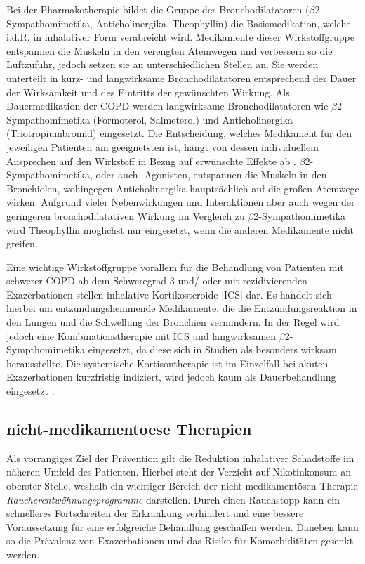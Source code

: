 Bei der Pharmakotherapie bildet die Gruppe der Bronchodilatatoren ($\beta$2- Sympathomimetika, Anticholinergika, Theophyllin) die Basismedikation, welche i.d.R. in inhalativer Form verabreicht wird.
Medikamente dieser Wirkstoffgruppe entspannen die Muskeln in den verengten Atemwegen und verbessern so die Luftzufuhr, jedoch setzen sie an unterschiedlichen Stellen an.
Sie werden unterteilt in kurz- und langwirksame Bronchodilatatoren entsprechend der Dauer der Wirksamkeit und des Eintritts der gewünschten Wirkung. Als Dauermedikation der COPD werden langwirksame Bronchodilatatoren wie $\beta$2-Sympathomimetika (Formoterol, Salmeterol) und Anticholinergika (Triotropiumbromid) eingesetzt. Die Entscheidung, welches Medikament für den jeweiligen Patienten am geeignetsten ist, hängt von dessen individuellem Ansprechen auf den Wirkstoff in Bezug auf erwünschte Effekte ab \autocite[vgl.][e13]{vogelmeier2007}. $\beta$2-Sympathomimetika, oder auch -Agonisten, entspannen die Muskeln in den Bronchiolen, wohingegen Anticholinergika hauptsächlich auf die großen Atemwege wirken. Aufgrund vieler Nebenwirkungen und Interaktionen aber auch wegen der geringeren bronchodilatativen Wirkung im Vergleich zu $\beta$2-Sympathomimetika wird Theophyllin möglichst nur eingesetzt, wenn die anderen Medikamente nicht greifen. 

Eine wichtige Wirkstoffgruppe vorallem für die Behandlung von Patienten mit schwerer COPD ab dem Schweregrad 3 und/ oder mit rezidivierenden Exazerbationen stellen inhalative Kortikosteroide [ICS] dar. Es handelt sich hierbei um entzündungshemmende Medikamente, die die Entzündungsreaktion in den Lungen und die Schwellung der Bronchien vermindern. In der Regel wird jedoch eine Kombinationstherapie mit ICS und langwirksamen $\beta$2-Sympthomimetika eingesetzt, da diese sich in Studien als besonders wirksam herausstellte. Die systemische Kortisontherapie ist im Einzelfall bei akuten Exazerbationen kurzfristig indiziert, wird jedoch kaum als Dauerbehandlung eingesetzt \autocite[vgl.][249f., 253]{gillissen2007}.

\subsection{nicht-medikamentoese Therapien}
\label{nicht-medikamentoese_therapien}
Als vorrangiges Ziel der Prävention gilt die Reduktion inhalativer Schadstoffe im näheren Umfeld des Patienten. Hierbei steht der Verzicht auf Nikotinkonsum an oberster Stelle, weshalb ein wichtiger Bereich der nicht-medikamentösen Therapie \emph{Raucherentwöhnungsprogramme} darstellen. Durch einen Rauchstopp kann ein schnelleres Fortschreiten der Erkrankung verhindert und eine bessere Voraussetzung für eine erfolgreiche Behandlung geschaffen werden. Daneben kann so die Prävalenz von Exazerbationen und das Risiko für Komorbiditäten gesenkt werden.

